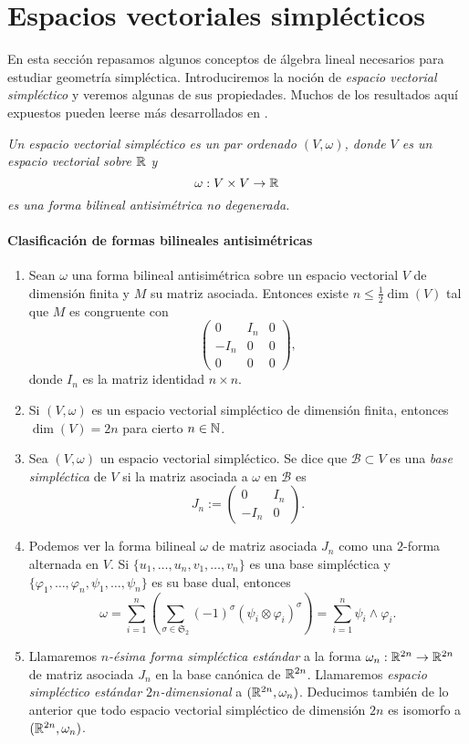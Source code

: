 
\section{Espacios vectoriales simplécticos}\label{sec:vectoriales}
En esta sección repasamos algunos conceptos de álgebra lineal necesarios para estudiar geometría simpléctica. Introduciremos la noción de \emph{espacio vectorial simpléctico} y veremos algunas de sus propiedades. Muchos de los resultados aquí expuestos pueden leerse más desarrollados en \cite{algebra}.
\begin{defn}
  \em
Un \emph{espacio vectorial simpléctico} es un par ordenado $(V,\omega)$, donde $V$ es un espacio vectorial sobre $\mathbb{R}$ y 
	\[
	  \omega: V \times V \rightarrow \mathbb{R}
	\]
	es una forma bilineal antisimétrica no degenerada.
\end{defn}

\paragraph{\bf Clasificación de formas bilineales antisimétricas}
  \begin{enumerate}
    \item Sean $\omega$ una forma bilineal antisimétrica sobre un espacio vectorial $V$ de dimensión finita y $M$ su matriz asociada. Entonces existe $n \leq \frac{1}{2}\dim(V)$ tal que $M$ es congruente con
      \[
	\left(
	\begin{array}{ccc}
	  0 & I_n & 0 \\
	  -I_n & 0 & 0 \\
	  0 & 0 & 0
	\end{array}\right),
      \]
      donde $I_n$ es la matriz identidad $n \times n$.
    \item Si $(V,\omega)$ es un espacio vectorial simpléctico de dimensión finita, entonces $\dim(V)=2n$ para cierto $n \in \mathbb{N}$.
    \item Sea $(V,\omega)$ un espacio vectorial simpléctico. Se dice que $\mathcal{B}\subset V$ es una \emph{base simpléctica} de $V$ si la matriz asociada a $\omega$ en $\mathcal{B}$ es
\[
  J_n :=
\left(
	\begin{array}{cc}
	  0 & I_n  \\
	  -I_n & 0 
	\end{array}\right).
      \]
    \item Podemos ver la forma bilineal $\omega$ de matriz asociada $J_n$ como una $2$-forma alternada en $V$. Si $\{u_1,\dots,u_n,v_1,\dots,v_n\}$ es una base simpléctica y $\{\varphi_1,\dots, \varphi_n, \psi_1,\dots, \psi_n \}$ es su base dual, entonces
  \[
    \omega = \sum_{i=1}^n \left(\sum_{\sigma \in \mathfrak{S}_2} (-1)^{\sigma} (\psi_i \otimes \varphi_i)^{\sigma}\right)= \sum_{i=1}^n \psi_i \wedge \varphi_i.
  \]
  \item Llamaremos \emph{$n$-ésima forma simpléctica estándar} a la forma $\omega_n:\mathbb{R}^{2n} \rightarrow \mathbb{R}^{2n}$ de matriz asociada $J_n$ en la base canónica de $\mathbb{R}^{2n}$. Llamaremos \emph{espacio simpléctico estándar $2n$-dimensional} a $(\mathbb{R}^{2n},\omega_n)$. Deducimos también de lo anterior que todo espacio vectorial simpléctico de dimensión $2n$ es isomorfo a $(\mathbb{R}^{2n},\omega_n)$.
\end{enumerate}
